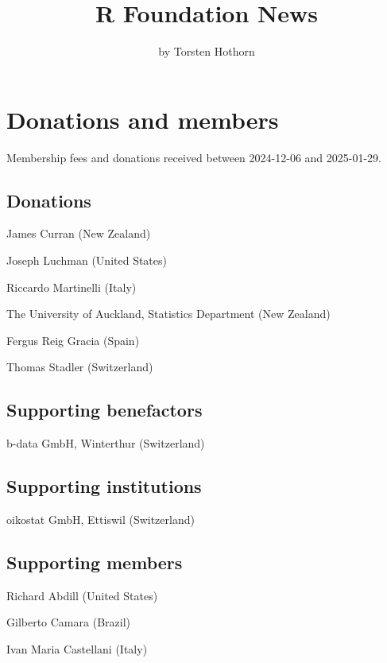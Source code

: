 \title{R Foundation News}


\author{by Torsten Hothorn}

\maketitle


\section{Donations and members}\label{donations-and-members}

Membership fees and donations received between
2024-12-06 and 2025-01-29.

\subsection{Donations}\label{donations}

James Curran (New Zealand)

Joseph Luchman (United States)

Riccardo Martinelli (Italy)

The University of Auckland, Statistics Department (New Zealand)

Fergus Reig Gracia (Spain)

Thomas Stadler (Switzerland)

\subsection{Supporting benefactors}\label{supporting-benefactors}

b-data GmbH, Winterthur (Switzerland)

\subsection{Supporting institutions}\label{supporting-institutions}

oikostat GmbH, Ettiswil (Switzerland)

\subsection{Supporting members}\label{supporting-members}

Richard Abdill (United States)

Gilberto Camara (Brazil)

Ivan Maria Castellani (Italy)

